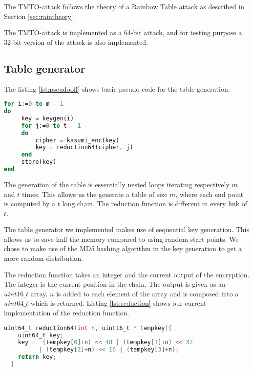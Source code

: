 The TMTO-attack follows the theory of a Rainbow Table attack as
described in Section \ref{sec:raintheory}.

The TMTO-attack is implemented as a 64-bit attack, and for testing
purpose a 32-bit version of the attack is also implemented.

\subsection{Table generator}
%
The listing \ref{lst:pseudooff} shows basic pseudo code for the table generation.

\begin{lstlisting}[frame=single, language=Pascal, mathescape,
captionpos=b, caption={Pseudo code for table generation}, label={lst:pseudooff}]
for i:=0 to m - 1
do
     key = keygen(i)
     for j:=0 to t - 1
     do
         cipher = kasumi_enc(key)
         key = reduction64(cipher, j)
     end
     store(key)
end
\end{lstlisting}
The generation of the table is essentially nested  loops iterating
respectively $m$ and $t$ times. This allows us the generate a table of
size $m$, where each end point is computed by a $t$ long chain. The
reduction function is different in every link of $t$.

The table generator we implemented makes use of sequential key
generation. This allows us to save half the memory compared to using
random start points. We chose to make use of the MD5 hashing algorithm
in the key generation to get a more random distribution.

The reduction function takes an integer and the current output of the encryption. The
integer is the current position in the chain. The output is given as an
$uint16\_t$ array. $n$ is added to each element of the array and is composed
into a $uint64\_t$ which is returned. Listing \ref{lst:reduction}
shows our current implementation of the reduction function.

\begin{lstlisting}[frame=single, language=C, mathescape,
captionpos=b, caption={Example reduction function}, label={lst:reduction}]
uint64_t reduction64(int n, uint16_t * tempkey){
    uint64_t key;
    key =  (tempkey[0]+n) << 48 | (tempkey[1]+n) << 32
          | (tempkey[2]+n) << 16 | (tempkey[3]+n);
    return key;
  }
\end{lstlisting}


